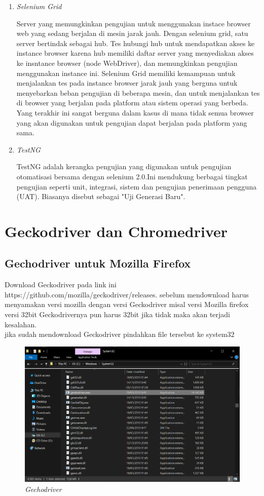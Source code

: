 \begin{enumerate}
\item \textit{Selenium Grid}
\par Server yang memungkinkan pengujian untuk menggunakan instace browser web yang sedang berjalan di mesin jarak jauh. Dengan selenium grid, satu server bertindak sebagai hub. Tes hubungi hub untuk mendapatkan akses ke instance browser karena hub memiliki daftar server yang menyediakan akses ke insntance browser (node WebDriver), dan memungkinkan pengujian menggunakan instance ini. Selenium Grid memiliki kemampuan untuk menjalankan tes pada instance browser jarak jauh yang berguna untuk menyebarkan beban pengujian di beberapa mesin, dan untuk menjalankan tes di browser yang berjalan pada platform atau sistem operasi yang berbeda. Yang terakhir ini sangat berguna dalam kasus di mana tidak semua browser yang akan digunakan untuk pengujian dapat berjalan pada platform yang sama.

\item \textit{TestNG} 
\par TestNG adalah kerangka pengujian yang digunakan untuk pengujian otomatisasi bersama dengan selenium 2.0.Ini mendukung berbagai tingkat pengujian seperti unit, integrasi, sistem dan pengujian penerimaan pengguna (UAT). Biasanya disebut sebagai "Uji Generasi Baru".
\end{enumerate}

\section{Geckodriver dan Chromedriver}
\subsection{Gechodriver untuk Mozilla Firefox}
\par Download Geckodriver pada link ini https://github.com/mozilla/geckodriver/releases. sebelum mendownload harus menyamakan versi mozilla dengan versi Geckodriver misal versi Mozilla firefox versi 32bit Geckodrivernya pun harus 32bit jika tidak maka akan terjadi kesalahan.\\

jika sudah mendownload Geckodriver pindahkan file tersebut ke system32
\begin{figure}[H]
    \centering
    \includegraphics[scale=0.3]{Figures/figures/gechodriver}
    \caption{\textit{Gechodriver}}
    \label{Geckodriver}
\end{figure}

